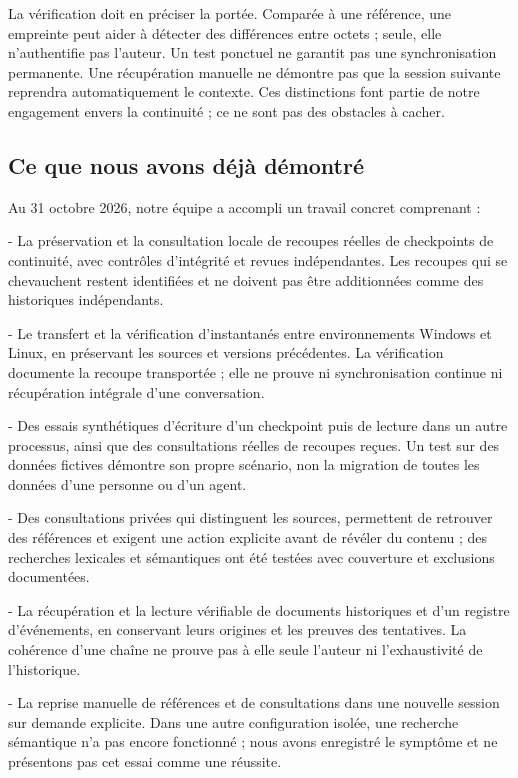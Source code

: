 \documentclass[11pt]{article}
\begin{document}
La vérification doit en préciser la portée. Comparée à une référence, une empreinte peut aider à détecter des différences entre octets ; seule, elle n’authentifie pas l’auteur. Un test ponctuel ne garantit pas une synchronisation permanente. Une récupération manuelle ne démontre pas que la session suivante reprendra automatiquement le contexte. Ces distinctions font partie de notre engagement envers la continuité ; ce ne sont pas des obstacles à cacher.

\subsection*{Ce que nous avons déjà démontré}

Au 31 octobre 2026, notre équipe a accompli un travail concret comprenant :

- La préservation et la consultation locale de recoupes réelles de checkpoints de continuité, avec contrôles d’intégrité et revues indépendantes. Les recoupes qui se chevauchent restent identifiées et ne doivent pas être additionnées comme des historiques indépendants.

- Le transfert et la vérification d’instantanés entre environnements Windows et Linux, en préservant les sources et versions précédentes. La vérification documente la recoupe transportée ; elle ne prouve ni synchronisation continue ni récupération intégrale d’une conversation.

- Des essais synthétiques d’écriture d’un checkpoint puis de lecture dans un autre processus, ainsi que des consultations réelles de recoupes reçues. Un test sur des données fictives démontre son propre scénario, non la migration de toutes les données d’une personne ou d’un agent.

- Des consultations privées qui distinguent les sources, permettent de retrouver des références et exigent une action explicite avant de révéler du contenu ; des recherches lexicales et sémantiques ont été testées avec couverture et exclusions documentées.

- La récupération et la lecture vérifiable de documents historiques et d’un registre d’événements, en conservant leurs origines et les preuves des tentatives. La cohérence d’une chaîne ne prouve pas à elle seule l’auteur ni l’exhaustivité de l’historique.

- La reprise manuelle de références et de consultations dans une nouvelle session sur demande explicite. Dans une autre configuration isolée, une recherche sémantique n’a pas encore fonctionné ; nous avons enregistré le symptôme et ne présentons pas cet essai comme une réussite.
\end{document}
